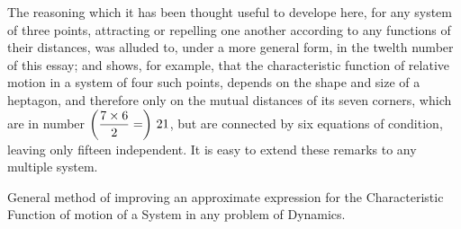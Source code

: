 The reasoning which it has been thought useful to develope here,
for any system of three points, attracting or repelling one
another according to any functions of their distances, was
alluded to, under a more general form, in the twelth number of
this essay; and shows, for example, that the characteristic
function of relative motion in a system of four such points,
depends on the shape and size of a heptagon, and therefore only
on the mutual distances of its seven corners, which are in number
$\displaystyle \left( {7 \times 6 \over 2} = \right) \, 21$,
but are connected by six equations of condition, leaving only
fifteen independent.  It is easy to extend these remarks to any
multiple system.

\bigbreak

{\sectiontitle
General method of improving an approximate expression for the
Characteristic Function of motion of a System in any problem
of Dynamics.\par}

\nobreak\bigskip

